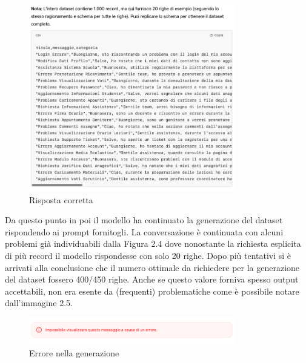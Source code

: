 \begin{figure}[H]
    \centering
    \includegraphics[width=0.8\textwidth]{images/csvResponse.png}
    \caption{Risposta corretta}
    \label{fig:csvResponse}
\end{figure}

\FloatBarrier

Da questo punto in poi il modello ha continuato la generazione del dataset rispondendo ai prompt fornitogli. La conversazione è continuata con alcuni problemi già individuabili dalla Figura 2.4 dove nonostante la richiesta esplicita di più record il modello rispondesse con solo 20 righe. Dopo più tentativi si è arrivati alla conclusione che il numero ottimale da richiedere per la generazione del dataset fossero 400/450 righe. Anche se questo valore forniva spesso output accettabili, non era esente da (frequenti) problematiche come è possibile notare dall'immagine 2.5.

\begin{figure}[H]
    \centering
    \includegraphics[width=0.8\textwidth]{images/error.png}
    \caption{Errore nella generazione}
    \label{fig:error}
\end{figure}


